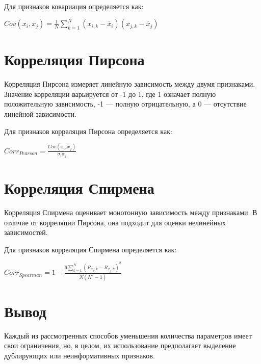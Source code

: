 Для признаков ковариация определяется как:

\begin{math}
    \label{cov}
    Cov(x_{i},x_{j})= \frac{1}{N}\sum_{k = 1}^{N}(x_{i,k}-\overline{x}_{i})(x_{j,k}-\overline{x}_{j})
\end{math} \cite{lib:covariance}

\section{Корреляция Пирсона}
Корреляция Пирсона измеряет линейную зависимость между двумя признаками. 
Значение корреляции варьируется от -1 до 1, где 1 означает полную положительную зависимость, -1 — полную отрицательную, а 0 — отсутствие линейной зависимости.

Для признаков корреляция Пирсона определяется как:

\begin{math}
    \label{pearson}
    Corr_{Pearson} = \frac{Cov(x_{i},x_{j})}{\sigma_{i}\sigma_{j}}
\end{math} \cite{lib:pearson}

\section{Корреляция Спирмена}
Корреляция Спирмена оценивает монотонную зависимость между признаками. 
В отличие от корреляции Пирсона, она подходит для оценки нелинейных зависимостей.

Для признаков корреляция Спирмена определяется как:

\begin{math}
    \label{spearman}
    Corr_{Spearman} = 1 - \frac{6\sum_{k=1}^{N}(R_{x_{i},k}-R_{x_{j},k})^{2}}{N(N^{2}-1)}
\end{math} \cite{lib:spearman}

\section*{Вывод}
Каждый из рассмотренных способов уменьшения количества параметров имеет свои ограничения, но, в целом, 
их использование предполагает выделение дублирующих или неинформативных признаков.

\clearpage

